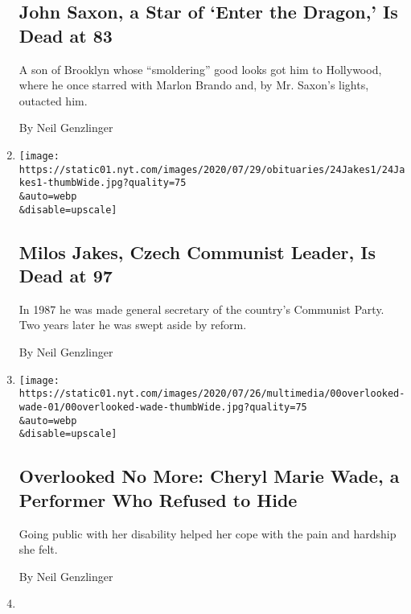 \begin{enumerate}
  \hypertarget{john-saxon-a-star-of-enter-the-dragon-is-dead-at-83}{%
  \subsection{John Saxon, a Star of `Enter the Dragon,' Is Dead at
  83}\label{john-saxon-a-star-of-enter-the-dragon-is-dead-at-83}}

  A son of Brooklyn whose ``smoldering'' good looks got him to
  Hollywood, where he once starred with Marlon Brando and, by Mr.
  Saxon's lights, outacted him.

  By Neil Genzlinger
\item
  \href{/2020/07/25/world/europe/milos-jakes-dead.html}{}

  \texttt{[image: https://static01.nyt.com/images/2020/07/29/obituaries/24Jakes1/24Jakes1-thumbWide.jpg?quality=75\\\&auto=webp\\\&disable=upscale]}

  \hypertarget{milos-jakes-czech-communist-leader-is-dead-at-97}{%
  \subsection{Milos Jakes, Czech Communist Leader, Is Dead at
  97}\label{milos-jakes-czech-communist-leader-is-dead-at-97}}

  In 1987 he was made general secretary of the country's Communist
  Party. Two years later he was swept aside by reform.

  By Neil Genzlinger
\item
  \href{/2020/07/23/obituaries/cheryl-marie-wade-overlooked.html}{}

  \texttt{[image: https://static01.nyt.com/images/2020/07/26/multimedia/00overlooked-wade-01/00overlooked-wade-thumbWide.jpg?quality=75\\\&auto=webp\\\&disable=upscale]}

  \hypertarget{overlooked-no-more-cheryl-marie-wade-a-performer-who-refused-to-hide}{%
  \subsection{Overlooked No More: Cheryl Marie Wade, a Performer Who
  Refused to
  Hide}\label{overlooked-no-more-cheryl-marie-wade-a-performer-who-refused-to-hide}}

  Going public with her disability helped her cope with the pain and
  hardship she felt.

  By Neil Genzlinger
\item
  \href{/2020/07/22/arts/television/phyllis-somerville-dead.html}{}


\end{enumerate}
